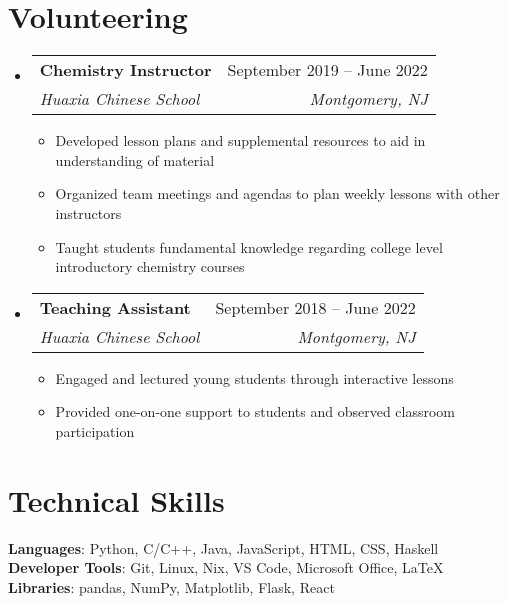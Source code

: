 \documentclass[letterpaper,11pt]{article}
\makeatletter
\newcommand{\resumeItem}[1]{
  \item\small{
    {#1 \vspace{-2pt}}
  }
}
\newcommand{\resumeSubheading}[4]{
  \vspace{-5pt}\item
    \begin{tabular*}{0.97\textwidth}[t]{l@{\extracolsep{\fill}}r}
      \textbf{#1} & #2 \\
      \textit{\small#3} & \textit{\small #4} \\
    \end{tabular*}\vspace{-5pt}
}
\newcommand{\resumeSubHeadingListStart}{\begin{itemize}[leftmargin=0.15in, label={}]}
\newcommand{\resumeSubHeadingListEnd}{\end{itemize}}
\newcommand{\resumeItemListStart}{\begin{itemize}}
\newcommand{\resumeItemListEnd}{\end{itemize}\vspace{-5pt}}
\makeatother
\begin{document}
    \section{Volunteering}
    \resumeSubHeadingListStart
  
      \resumeSubheading
        {Chemistry Instructor}{September 2019 -- June 2022}
        {Huaxia Chinese School}{Montgomery, NJ}
        \resumeItemListStart
          \resumeItem{Developed lesson plans and supplemental resources to aid in understanding of material}
          \resumeItem{Organized team meetings and agendas to plan weekly lessons with other instructors}
          \resumeItem{Taught students fundamental knowledge regarding college level introductory chemistry courses}
        \resumeItemListEnd
      
      \resumeSubheading
        {Teaching Assistant}{September 2018 -- June 2022}
        {Huaxia Chinese School}{Montgomery, NJ}
        \resumeItemListStart
          \resumeItem{Engaged and lectured young students through interactive lessons}
          \resumeItem{Provided one-on-one support to students and observed classroom participation}
        \resumeItemListEnd
  
    \resumeSubHeadingListEnd

\section{Technical Skills}
 \begin{itemize}[leftmargin=0.15in, label={}]
    \small{\item{
     \textbf{Languages}{: Python, C/C++, Java, JavaScript, HTML, CSS, Haskell} \\
     \textbf{Developer Tools}{: Git, Linux, Nix, VS Code, Microsoft Office, LaTeX} \\
     \textbf{Libraries}{: pandas, NumPy, Matplotlib, Flask, React}
    }}
 \end{itemize}


\end{document}
